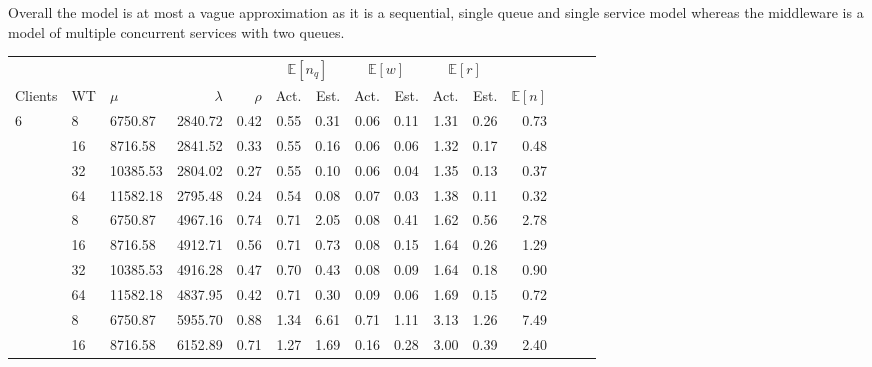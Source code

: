         Overall the model is at most a vague approximation as it is a sequential, single queue and single service model
        whereas the middleware is a model of multiple concurrent services with two queues.

        \begin{table}
            \footnotesize{
                \begin{tabular}{lllrrrrrrrrrrrr}
                    \toprule
                    & & & & & \multicolumn{2}{c}{$\mathbb{E}[n_q]$} & \multicolumn{2}{c}{$\mathbb{E}[w]$} & \multicolumn{2}{c}{$\mathbb{E}[r]$} & \\
                    \cmidrule(lr){6-7}
                    \cmidrule(lr){8-9}
                    \cmidrule(lr){10-11}
                    Clients & WT & $\mu$        & $\lambda$ & $\rho$ & Act.   & Est.   & Act.  & Est.  & Act.  & Est.  & $\mathbb{E}[n]$ \\
                    \midrule
                    6       & 8  & 6750.87  & 2840.72   & 0.42   & 0.55   & 0.31   & 0.06  & 0.11  & 1.31  & 0.26  & 0.73    \\
                            & 16 & 8716.58  & 2841.52   & 0.33   & 0.55   & 0.16   & 0.06  & 0.06  & 1.32  & 0.17  & 0.48    \\
                            & 32 & 10385.53 & 2804.02   & 0.27   & 0.55   & 0.10   & 0.06  & 0.04  & 1.35  & 0.13  & 0.37    \\
                            & 64 & 11582.18 & 2795.48   & 0.24   & 0.54   & 0.08   & 0.07  & 0.03  & 1.38  & 0.11  & 0.32    \\
                    \addlinespace
                    12      & 8  & 6750.87  & 4967.16   & 0.74   & 0.71   & 2.05   & 0.08  & 0.41  & 1.62  & 0.56  & 2.78    \\
                            & 16 & 8716.58  & 4912.71   & 0.56   & 0.71   & 0.73   & 0.08  & 0.15  & 1.64  & 0.26  & 1.29    \\
                            & 32 & 10385.53 & 4916.28   & 0.47   & 0.70   & 0.43   & 0.08  & 0.09  & 1.64  & 0.18  & 0.90    \\
                            & 64 & 11582.18 & 4837.95   & 0.42   & 0.71   & 0.30   & 0.09  & 0.06  & 1.69  & 0.15  & 0.72    \\
                    \addlinespace
                    24      & 8  & 6750.87  & 5955.70   & 0.88   & 1.34   & 6.61   & 0.71  & 1.11  & 3.13  & 1.26  & 7.49    \\
                            & 16 & 8716.58  & 6152.89   & 0.71   & 1.27   & 1.69   & 0.16  & 0.28  & 3.00  & 0.39  & 2.40    \\

\end{tabular}}
\end{table}
